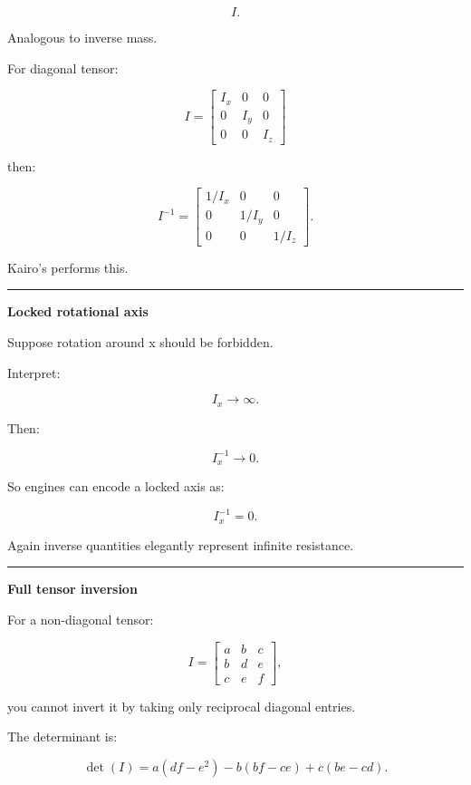 \[
I.
\]

Analogous to inverse mass.

For diagonal tensor:

\[
I=
\begin{bmatrix}
I_x&0&0\\
0&I_y&0\\
0&0&I_z
\end{bmatrix}
\]

then:

\[
\boxed{
I^{-1}
=
\begin{bmatrix}
1/I_x&0&0\\
0&1/I_y&0\\
0&0&1/I_z
\end{bmatrix}.
}
\]

Kairo's  performs this.

\begin{center}\rule{0.5\linewidth}{0.5pt}\end{center}

\textbf{Locked rotational axis}

Suppose rotation around x should be forbidden.

Interpret:

\[
I_x\rightarrow\infty.
\]

Then:

\[
I_x^{-1}\rightarrow0.
\]

So engines can encode a locked axis as:

\[
I_x^{-1}=0.
\]

Again inverse quantities elegantly represent infinite resistance.

\begin{center}\rule{0.5\linewidth}{0.5pt}\end{center}

\textbf{Full tensor inversion}

For a non-diagonal tensor:

\[
I=
\begin{bmatrix}
a&b&c\\
b&d&e\\
c&e&f
\end{bmatrix},
\]

you cannot invert it by taking only reciprocal diagonal entries.

The determinant is:

\[
\det(I)
=
a(df-e^2)
-
b(bf-ce)
+
c(be-cd).
\]

